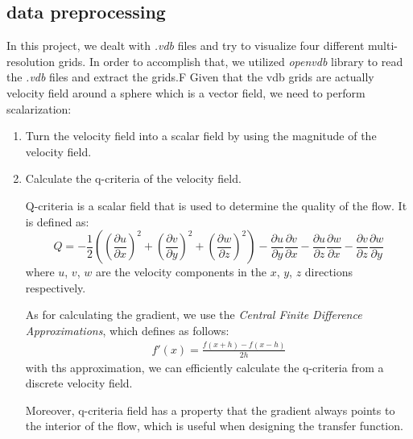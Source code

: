 \documentclass[acmtog]{acmart}
\begin{document}
    \subsection{data preprocessing}\label{subsec:data-preprocessing}
    In this project, we dealt with \emph{.vdb} files and try to visualize four different multi-resolution grids.
    In order to accomplish that, we utilized \emph{openvdb} library to read the \emph{.vdb} files and extract the grids.F
    Given that the vdb grids are actually velocity field around a sphere which is a vector field, we need to perform scalarization:
    \begin{enumerate}
        \item Turn the velocity field into a scalar field by using the magnitude of the velocity field.
        \item Calculate the q-criteria of the velocity field.
        \par Q-criteria is a scalar field that is used to determine the quality of the flow.
        It is defined as:
        \begin{equation}
            Q = -\frac{1}{2}\left( \left( \frac{\partial u}{\partial x} \right)^2 + \left( \frac{\partial v}{\partial y} \right)^2 + \left( \frac{\partial w}{\partial z} \right)^2 \right) - \frac{\partial u}{\partial y}\frac{\partial v}{\partial x} - \frac{\partial u}{\partial z}\frac{\partial w}{\partial x} - \frac{\partial v}{\partial z}\frac{\partial w}{\partial y}\label{eq:equation}
        \end{equation}
        where $u$, $v$, $w$ are the velocity components in the $x$, $y$, $z$ directions respectively.
        \par As for calculating the gradient, we use the \emph{Central Finite Difference Approximations}, which defines as follows:
        \begin{align*}
            f'(x)=\frac{f(x+h)-f(x-h)}{2h}
        \end{align*}
        with ths approximation, we can efficiently calculate the q-criteria from a discrete velocity field.
        \par Moreover, q-criteria field has a property that the gradient always points to the interior of the flow, which is useful when designing the transfer function.
    \end{enumerate}
\end{document}
